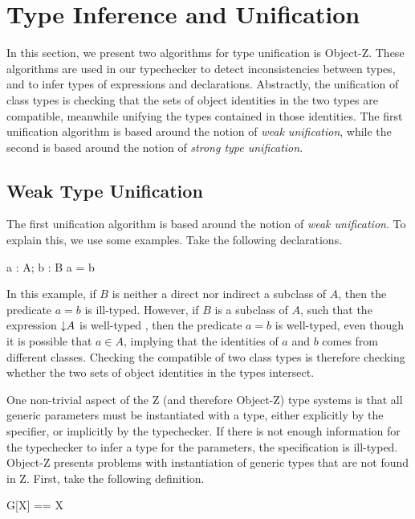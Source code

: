 \section{Type Inference and Unification}
\label{inference}

In this section, we present two algorithms for type unification is
Object-Z. These algorithms are used in our typechecker to detect
inconsistencies between types, and to infer types of expressions and
declarations. Abstractly, the unification of class types is checking
that the sets of object identities in the two types are compatible,
meanwhile unifying the types contained in those identities. The first
unification algorithm is based around the notion of {\em weak
unification}, while the second is based around the notion of {\em
strong type unification}.

\subsection{Weak Type Unification}

The first unification algorithm is based around the notion of {\em
  weak unification}. To explain this, we use some  examples. Take the
  following declarations.

\begin{axdef}
  a : \poly A; b : B
\where
  a = b
\end{axdef}

In this example, if $B$ is neither a direct nor indirect a subclass of
$A$, then the predicate $a=b$ is ill-typed. However, if $B$ is
a subclass of $A$, such that the expression $\mathord\downarrow A$ is well-typed
, then the predicate $a=b$ is well-typed, even though
it is possible that $a \in A$, implying that the identities of $a$ and
$b$ comes from different classes. Checking the compatible of two
class types is therefore checking whether the two sets of object
identities in the types intersect.

One non-trivial aspect of the Z (and therefore Object-Z) type systems
is that all generic parameters must be instantiated with a type,
either explicitly by the specifier, or implicitly by the
typechecker. If there is not enough information for the typechecker to
infer a type for the parameters, the specification is
ill-typed. Object-Z presents problems with instantiation of generic
types that are not found in Z. First, take the following definition.

\begin{zed}
 G[X] == X
\end{zed}

